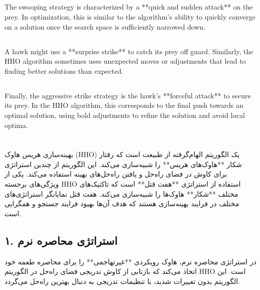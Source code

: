 \documentclass{article}
\begin{document}
\subsection*{}
The swooping strategy is characterized by a **quick and sudden attack** on the prey. In optimization, this is similar to the algorithm’s ability to quickly converge on a solution once the search space is sufficiently narrowed down.

\subsection*{}
A hawk might use a **surprise strike** to catch its prey off guard. Similarly, the HHO algorithm sometimes uses unexpected moves or adjustments that lead to finding better solutions than expected.

\subsection*{}
Finally, the aggressive strike strategy is the hawk’s **forceful attack** to secure its prey. In the HHO algorithm, this corresponds to the final push towards an optimal solution, using bold adjustments to refine the solution and avoid local optima.

\newpage 
\RTL

\section*{}
بهینه‌سازی هریس هاوک (HHO) یک الگوریتم الهام‌گرفته از طبیعت است که رفتار شکار **هاوک‌های هریس** را شبیه‌سازی می‌کند. این الگوریتم از چندین استراتژی برای کاوش در فضای راه‌حل و یافتن راه‌حل‌های بهینه استفاده می‌کند. یکی از ویژگی‌های برجسته HHO استفاده از استراتژی **هفت قتل** است که تاکتیک‌های مختلف **شکار** هاوک‌ها را شبیه‌سازی می‌کند. هفت قتل نمایانگر استراتژی‌های مختلف در فرایند بهینه‌سازی هستند که هدف آن‌ها بهبود فرایند جستجو و همگرایی است.

\subsection*{۱. استراتژی محاصره نرم}
در استراتژی محاصره نرم، هاوک رویکردی **غیرتهاجمی** را برای محاصره طعمه خود اتخاذ می‌کند که بازتابی از کاوش تدریجی فضای راه‌حل در الگوریتم HHO است. این الگوریتم بدون تغییرات شدید، با تنظیمات تدریجی به دنبال بهترین راه‌حل می‌گردد.
\end{document}
